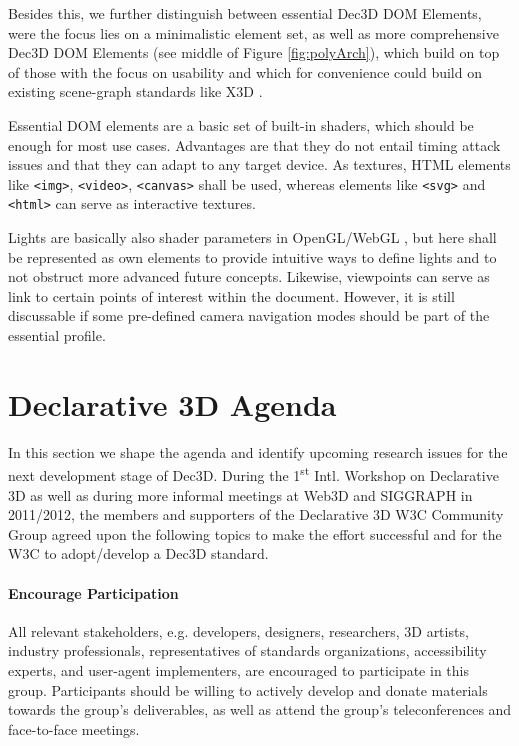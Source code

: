 \documentclass{acmsiggraph}
\begin{document}
Besides this, we further distinguish between essential Dec3D DOM Elements, were the focus lies on a minimalistic element set, as well as more comprehensive Dec3D DOM Elements (see middle of Figure \ref{fig:polyArch}), which build on top of those with the focus on usability and which for convenience could build on existing scene-graph standards like X3D \cite{Web3D-X3D}.

Essential DOM elements are a basic set of built-in shaders, which should be enough for most use cases. Advantages are that they do not entail timing attack issues and that they can adapt to any target device. As textures, HTML elements like \verb|<img>|, \verb|<video>|, \verb|<canvas>| shall be used, whereas elements like \verb|<svg>| and \verb|<html>| can serve as interactive textures.

Lights are basically also shader parameters in OpenGL/WebGL \cite{WebGL12}, but here shall be represented as own elements to provide intuitive ways to define lights and to not obstruct more advanced future concepts.
Likewise, viewpoints can serve as link to certain points of interest within the document. However, it is still discussable if some pre-defined camera navigation modes should be part of the essential profile.


\section{Declarative 3D Agenda}
\label{sec:Agenda}

In this section we shape the agenda and identify upcoming research issues for the next development stage of Dec3D.
During the 1\textsuperscript{st} Intl. Workshop on Declarative 3D \cite{Dec3D2012} as well as during more informal meetings at Web3D and SIGGRAPH in 2011/2012, the members and supporters of the Declarative 3D W3C Community Group agreed upon the following topics to make the effort successful and for the W3C to adopt/develop a Dec3D standard.

\paragraph{Encourage Participation}
All relevant stakeholders, e.g. developers, designers, researchers, 3D artists, industry professionals, representatives of standards organizations, accessibility experts, and user-agent implementers, are encouraged to participate in this group. Participants should be willing to actively develop and donate materials towards the group's deliverables, as well as attend the group's teleconferences and face-to-face meetings.
\end{document}
